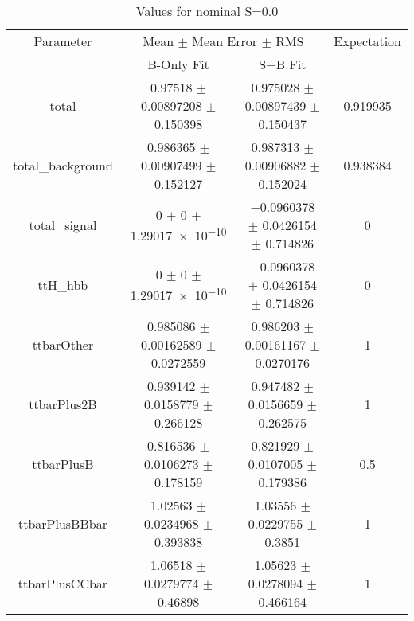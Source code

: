 \begin{table}
\centering
\caption{Values for nominal S=0.0}
\begin{tabular}{cccc}
\toprule
Parameter & \multicolumn{2}{c}{Mean $\pm$ Mean Error $\pm$ RMS} & Expectation\\
 & B-Only Fit & S+B Fit & \\
\midrule
total & \num{0.97518} $\pm$ \num{0.00897208} $\pm$ \num{0.150398} & \num{0.975028} $\pm$ \num{0.00897439} $\pm$ \num{0.150437} & \num{0.919935}\\
total\_background & \num{0.986365} $\pm$ \num{0.00907499} $\pm$ \num{0.152127} & \num{0.987313} $\pm$ \num{0.00906882} $\pm$ \num{0.152024} & \num{0.938384}\\
total\_signal & \num{0} $\pm$ \num{0} $\pm$ \num{1.29017e-10} & \num{-0.0960378} $\pm$ \num{0.0426154} $\pm$ \num{0.714826} & \num{0}\\
ttH\_hbb & \num{0} $\pm$ \num{0} $\pm$ \num{1.29017e-10} & \num{-0.0960378} $\pm$ \num{0.0426154} $\pm$ \num{0.714826} & \num{0}\\
ttbarOther & \num{0.985086} $\pm$ \num{0.00162589} $\pm$ \num{0.0272559} & \num{0.986203} $\pm$ \num{0.00161167} $\pm$ \num{0.0270176} & \num{1}\\
ttbarPlus2B & \num{0.939142} $\pm$ \num{0.0158779} $\pm$ \num{0.266128} & \num{0.947482} $\pm$ \num{0.0156659} $\pm$ \num{0.262575} & \num{1}\\
ttbarPlusB & \num{0.816536} $\pm$ \num{0.0106273} $\pm$ \num{0.178159} & \num{0.821929} $\pm$ \num{0.0107005} $\pm$ \num{0.179386} & \num{0.5}\\
ttbarPlusBBbar & \num{1.02563} $\pm$ \num{0.0234968} $\pm$ \num{0.393838} & \num{1.03556} $\pm$ \num{0.0229755} $\pm$ \num{0.3851} & \num{1}\\
ttbarPlusCCbar & \num{1.06518} $\pm$ \num{0.0279774} $\pm$ \num{0.46898} & \num{1.05623} $\pm$ \num{0.0278094} $\pm$ \num{0.466164} & \num{1}\\
\bottomrule
\end{tabular}
\end{table}
